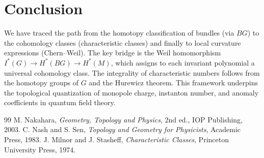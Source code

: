 \documentclass[11pt]{article}
\begin{document}
\section{Conclusion}
We have traced the path from the homotopy classification of bundles (via \(BG\)) to the cohomology classes (characteristic classes) and finally to local curvature expressions (Chern--Weil). The key bridge is the Weil homomorphism \(I^*(G)\to H^*(BG)\to H^*(M)\), which assigns to each invariant polynomial a universal cohomology class. The integrality of characteristic numbers follows from the homotopy groups of \(G\) and the Hurewicz theorem. This framework underpins the topological quantization of monopole charge, instanton number, and anomaly coefficients in quantum field theory.

\begin{thebibliography}{99}
 M. Nakahara, \textit{Geometry, Topology and Physics}, 2nd ed., IOP Publishing, 2003.
 C. Nash and S. Sen, \textit{Topology and Geometry for Physicists}, Academic Press, 1983.
 J. Milnor and J. Stasheff, \textit{Characteristic Classes}, Princeton University Press, 1974.
\end{thebibliography}
\end{document}
